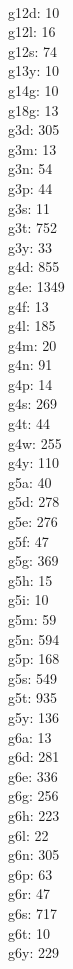 \begin{multicols}{8}
  \\ g12d: 10
  \\ g12l: 16
  \\ g12s: 74
  \\ g13y: 10
  \\ g14g: 10
  \\ g18g: 13
  \\ g3d: 305
  \\ g3m: 13
  \\ g3n: 54
  \\ g3p: 44
  \\ g3s: 11
  \\ g3t: 752
  \\ g3y: 33
  \\ g4d: 855
  \\ g4e: 1349
  \\ g4f: 13
  \\ g4l: 185
  \\ g4m: 20
  \\ g4n: 91
  \\ g4p: 14
  \\ g4s: 269
  \\ g4t: 44
  \\ g4w: 255
  \\ g4y: 110
  \\ g5a: 40
  \\ g5d: 278
  \\ g5e: 276
  \\ g5f: 47
  \\ g5g: 369
  \\ g5h: 15
  \\ g5i: 10
  \\ g5m: 59
  \\ g5n: 594
  \\ g5p: 168
  \\ g5s: 549
  \\ g5t: 935
  \\ g5y: 136
  \\ g6a: 13
  \\ g6d: 281
  \\ g6e: 336
  \\ g6g: 256
  \\ g6h: 223
  \\ g6l: 22
  \\ g6n: 305
  \\ g6p: 63
  \\ g6r: 47
  \\ g6s: 717
  \\ g6t: 10
  \\ g6y: 229

\end{multicols}
